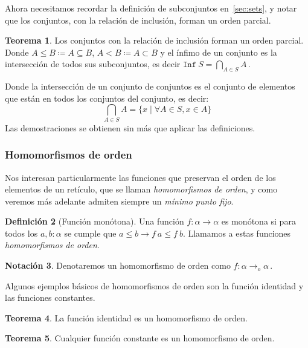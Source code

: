 \documentclass[
  a4paper, 
  10pt, 
  parskip=half, 
  toc=bibliography,
]{scrbook}
\theoremstyle{definition}
\theoremstyle{bolddef}
\newtheorem{theorem}{Teorema}[section]
\newtheorem{definition}[theorem]{Definición}
\newtheorem{notation}[theorem]{Notación}
\newcommand{\funfont}[1]{\texttt{#1}}
\renewcommand{\implies}{\rightarrow}
\begin{document}
Ahora necesitamos recordar la definición de subconjuntos en~\ref{sec:sets},
y notar que los conjuntos, con la relación de inclusión, forman un orden parcial.

\begin{theorem}
  Los conjuntos con la relación de inclusión forman un orden parcial. Donde
  \(A \leq B \coloneqq A \subseteq B\), \(A < B \coloneqq A \subset B\)
  y el ínfimo de un conjunto es la intersección de todos sus subconjuntos,
  es decir \(\funfont{Inf} \ S = \bigcap_{A \in S} A\,\).
\end{theorem}

Donde la intersección de un conjunto de conjuntos es el conjunto de elementos que
están en todos los conjuntos del conjunto, es decir:
\[
  \bigcap_{A \in S} A = \{x \mid \forall A \in S, x \in A\}
\]
Las demostraciones se obtienen sin más que aplicar las definiciones.

\subsubsection{Homomorfismos de orden}\label{sec:order_homomorphisms}

Nos interesan particularmente las funciones que preservan el orden de los elementos
de un retículo, que se llaman \emph{homomorfismos de orden}, y como veremos
más adelante admiten siempre un \emph{mínimo punto fijo}.

\begin{definition}[Función monótona]
  Una función \(f: \alpha \to \alpha\) es monótona si para todos los \(a, b: \alpha\)
  se cumple que \(a \leq b \implies f \ a \leq f \ b\). Llamamos a estas funciones
  \emph{homomorfismos de orden}.
\end{definition}

\begin{notation}
  Denotaremos un homomorfismo de orden como \(f: \alpha \to_o \alpha \,\).
\end{notation}

Algunos ejemplos básicos de homomorfismos de orden son la función identidad y las funciones
constantes.

\begin{theorem}
  La función identidad es un homomorfismo de orden.
\end{theorem}

\begin{theorem}
  Cualquier función constante es un homomorfismo de orden.
\end{theorem}
\end{document}
